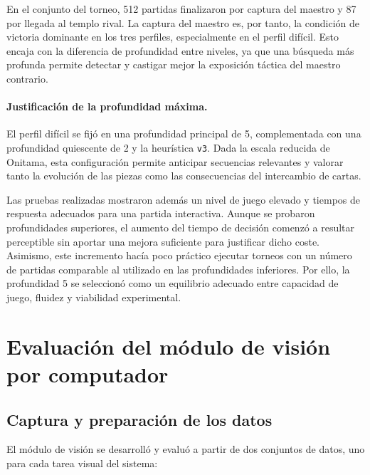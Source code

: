 En el conjunto del torneo, 512 partidas finalizaron por captura del maestro y 87 por llegada al templo rival. La captura del maestro es, por tanto, la condición de victoria dominante en los tres perfiles, especialmente en el perfil difícil. Esto encaja con la diferencia de profundidad entre niveles, ya que una búsqueda más profunda permite detectar y castigar mejor la exposición táctica del maestro contrario.

\paragraph{Justificación de la profundidad máxima.}
El perfil difícil se fijó en una profundidad principal de 5, complementada con una profundidad quiescente de 2 y la heurística \texttt{v3}. Dada la escala reducida de Onitama, esta configuración permite anticipar secuencias relevantes y valorar tanto la evolución de las piezas como las consecuencias del intercambio de cartas.

Las pruebas realizadas mostraron además un nivel de juego elevado y tiempos de respuesta adecuados para una partida interactiva. Aunque se probaron profundidades superiores, el aumento del tiempo de decisión comenzó a resultar perceptible sin aportar una mejora suficiente para justificar dicho coste. Asimismo, este incremento hacía poco práctico ejecutar torneos con un número de partidas comparable al utilizado en las profundidades inferiores. Por ello, la profundidad 5 se seleccionó como un equilibrio adecuado entre capacidad de juego, fluidez y viabilidad experimental.


\section{Evaluación del módulo de visión por computador}
\label{sec:evaluacion-vision-computador}

\subsection{Captura y preparación de los datos}
\label{subsec:captura-preparacion-datos}

El módulo de visión se desarrolló y evaluó a partir de dos conjuntos de datos, uno para cada tarea visual del sistema:

